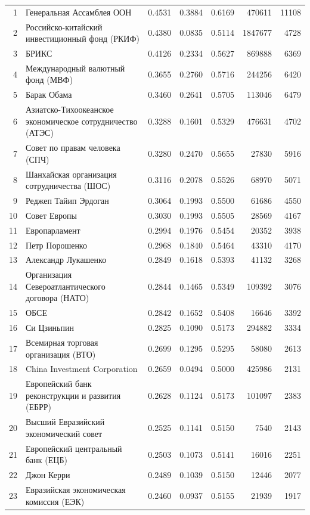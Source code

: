 {\begin{longtable}{r >{\raggedright\arraybackslash}p{4.2cm} S[table-format=1.4] S[table-format=1.4] S[table-format=1.4] r r}
1 & Генеральная Ассамблея ООН & 0.4531 & 0.3884 & 0.6169 & 470611 & 11108 \\
2 & Российско-китайский инвестиционный фонд (РКИФ) & 0.4380 & 0.0835 & 0.5114 & 1847677 & 4728 \\
3 & БРИКС & 0.4126 & 0.2334 & 0.5627 & 869888 & 6369 \\
4 & Международный валютный фонд (МВФ) & 0.3655 & 0.2760 & 0.5716 & 244256 & 6420 \\
5 & Барак Обама & 0.3460 & 0.2641 & 0.5705 & 113046 & 6479 \\
6 & Азиатско-Тихоокеанское экономическое сотрудничество (АТЭС) & 0.3288 & 0.1601 & 0.5329 & 476631 & 4702 \\
7 & Совет по правам человека (СПЧ) & 0.3280 & 0.2470 & 0.5655 & 27830 & 5916 \\
8 & Шанхайская организация сотрудничества (ШОС) & 0.3116 & 0.2078 & 0.5526 & 68970 & 5071 \\
9 & Реджеп Тайип Эрдоган & 0.3064 & 0.1993 & 0.5500 & 61686 & 4550 \\
10 & Совет Европы & 0.3030 & 0.1993 & 0.5505 & 28569 & 4167 \\
11 & Европарламент & 0.2994 & 0.1976 & 0.5454 & 20352 & 3938 \\
12 & Петр Порошенко & 0.2968 & 0.1840 & 0.5464 & 43310 & 4170 \\
13 & Александр Лукашенко & 0.2849 & 0.1618 & 0.5393 & 41132 & 3268 \\
14 & Организация Североатлантического договора (НАТО) & 0.2844 & 0.1465 & 0.5349 & 109392 & 3076 \\
15 & ОБСЕ & 0.2842 & 0.1652 & 0.5408 & 16646 & 3392 \\
16 & Си Цзиньпин & 0.2825 & 0.1090 & 0.5173 & 294882 & 3334 \\
17 & Всемирная торговая организация (ВТО) & 0.2699 & 0.1295 & 0.5295 & 58080 & 2613 \\
18 & China Investment Corporation & 0.2659 & 0.0494 & 0.5000 & 425986 & 2131 \\
19 & Европейский банк реконструкции и развития (ЕБРР) & 0.2628 & 0.1124 & 0.5173 & 101097 & 2383 \\
20 & Высший Евразийский экономический совет & 0.2525 & 0.1141 & 0.5150 & 7540 & 2143 \\
21 & Европейский центральный банк (ЕЦБ) & 0.2503 & 0.1073 & 0.5141 & 16016 & 2251 \\
22 & Джон Керри & 0.2489 & 0.1039 & 0.5150 & 12446 & 2077 \\
23 & Евразийская экономическая комиссия (ЕЭК) & 0.2460 & 0.0937 & 0.5155 & 21939 & 1917 \\

\end{longtable}}
